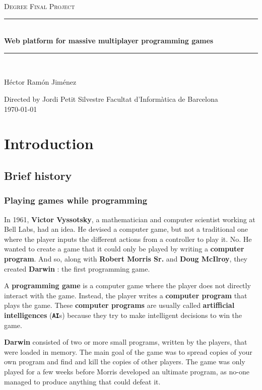 \documentclass[a4paper,11pt,titlepage,abstract,numbers=noenddot,automark,mnsy,intlimits,rgb,dvipsnames]{report}
\begin{document}
\begin{titlepage}
\begin{center}
\textsc{\Large Degree Final Project}
\\[1.5cm]
\rule{\linewidth}{0.5mm}
\\[0.4cm]
{\huge
\bfseries
Web platform for massive multiplayer programming games
\\[0.4cm]
}
\rule{\linewidth}{0.5mm}
\\[2.5cm]
\begin{center}
\large
Héctor Ramón Jiménez
\end{center}
Directed by Jordi Petit Silvestre
\vfill
{\large
Facultat d'Informàtica de Barcelona
}
\\[0.5cm]
{\large
\today
}
\end{center}
\end{titlepage}
\clearpage
\begin{abstract}
...
\end{abstract}
\clearpage
\tableofcontents
\clearpage
\chapter{Introduction}
\section{Brief history}
\subsection{Playing games while programming}
In 1961, \textbf{Victor Vyssotsky}, a mathematician and computer scientist working at Bell Labs, had an idea. He devised
a computer game, but not a traditional one where the player inputs the different actions from a controller to play it.
No. He wanted to create a game that it could only be played by writing a \textbf{computer program}. And so, along with \textbf{Robert
Morris Sr.} and \textbf{Doug McIlroy}, they created \textbf{Darwin} \cite{darwin}: the first programming game.

A \textbf{programming game} is a computer game where the player does not directly interact with the game. Instead, the
player writes a \textbf{computer program} that plays the game. These \textbf{computer programs} are usually called \textbf{artifficial
intelligences} (\textbf{\texttt{AI}}s) because they try to make intelligent decisions to win the game.

\textbf{Darwin} consisted of two or more small programs, written by the players, that were loaded in memory. The main goal
of the game was to spread copies of your own program and find and kill the copies of other players. The game was only
played for a few weeks before Morris developed an ultimate program, as no-one managed to produce anything that could
defeat it.
\end{document}
